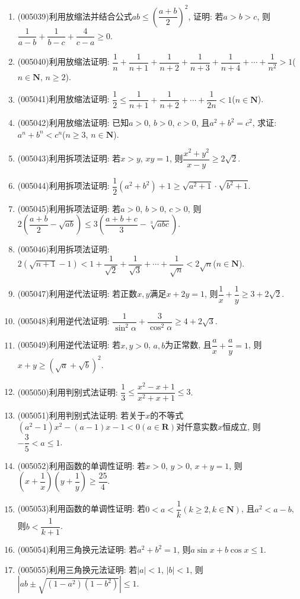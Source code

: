 \documentclass[10pt,a4paper]{article}
\begin{document}
\begin{enumerate}[1.]
\item {\tiny (005039)}利用放缩法并结合公式$ab\le (\dfrac{a+b}2)^2$, 证明: 若$a>b>c$, 则$\dfrac 1{a-b}+\dfrac 1{b-c}+\dfrac 4{c-a}\ge 0$.
\item {\tiny (005040)}利用放缩法证明: $\dfrac 1n+\dfrac 1{n+1}+\dfrac 1{n+2}+\dfrac 1{n+3}+\dfrac 1{n+4}+\cdots +\dfrac 1{n^2}>1$($n\in \mathbf{N}$, $n\ge 2$).
\item {\tiny (005041)}利用放缩法证明: $\dfrac 12\le \dfrac 1{n+1}+\dfrac 1{n+2}+\cdots +\dfrac 1{2n}<1$($n\in \mathbf{N}$).
\item {\tiny (005042)}利用放缩法证明: 已知$a>0$, $b>0$, $c>0$, 且$a^2+b^2=c^2$, 求证: $a^n+b^n<c^n$($n\ge 3$, $n\in \mathbf{N}$).
\item {\tiny (005043)}利用拆项法证明: 若$x>y$, $xy=1$, 则$\dfrac{x^2+y^2}{x-y}\ge 2\sqrt 2$.
\item {\tiny (005044)}利用拆项法证明: $\dfrac 12({a^2}+{b^2})+1\ge \sqrt{{a^2}+1}\cdot \sqrt{{b^2}+1}$.
\item {\tiny (005045)}利用拆项法证明: 若$a>0$, $b>0$, $c>0$, 则$2(\dfrac{a+b}2-\sqrt{ab})\le 3(\dfrac{a+b+c}3-\sqrt[3]{abc})$.
\item {\tiny (005046)}利用拆项法证明: $2(\sqrt{n+1}-1)<1+\dfrac 1{\sqrt 2}+\dfrac 1{\sqrt 3}+\cdots +\dfrac 1{\sqrt n}<2\sqrt n$($n\in \mathbf{N}$).
\item {\tiny (005047)}利用逆代法证明: 若正数$x,y$满足$x+2y=1$, 则$\dfrac 1x+\dfrac 1y\ge 3+2\sqrt 2$.
\item {\tiny (005048)}利用逆代法证明: $\dfrac 1{\sin ^2\alpha}+\dfrac 3{\cos^2\alpha}\ge 4+2\sqrt 3$.
\item {\tiny (005049)}利用逆代法证明: 若$x,y>0$, $a,b$为正常数, 且$\dfrac ax+\dfrac ay=1$, 则$x+y\ge (\sqrt a+\sqrt b)^2$.
\item {\tiny (005050)}利用判别式法证明: $\dfrac 13\le \dfrac{x^2-x+1}{x^2+x+1}\le 3$.
\item {\tiny (005051)}利用判别式法证明: 若关于$x$的不等式$(a^2-1)x^2-(a-1)x-1<0(a\in \mathbf{R})$对仟意实数$x$恒成立, 则$-\dfrac 35<a\le 1$.
\item {\tiny (005052)}利用函数的单调性证明: 若$x>0$, $y>0$, $x+y=1$, 则$(x+\dfrac 1x)(y+\dfrac 1y)\ge \dfrac{25}4$.
\item {\tiny (005053)}利用函数的单调性证明: 若$0<a<\dfrac 1k(k\ge 2,k\in \mathbf{N})$, 且$a^2<a-b$, 则$b<\dfrac 1{k+1}$.
\item {\tiny (005054)}利用三角换元法证明: 若$a^2+b^2=1$, 则$a\sin x+b\cos x\le 1$.
\item {\tiny (005055)}利用三角换元法证明: 若$|a|<1$, $|b|<1$, 则$|ab\pm \sqrt{(1-{a^2})(1-{b^2})}|\le 1$.

\end{enumerate}
\end{document}

